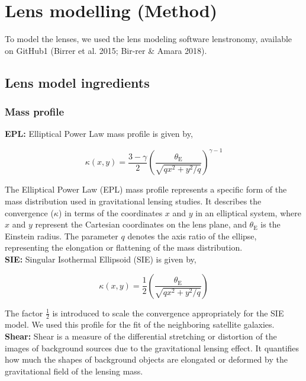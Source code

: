 \documentclass{aa}
\begin{document}
\section{Lens modelling (Method)} \label{sec:modeling_method}

To model the lenses, we used the lens modeling software lenstronomy, available on GitHub1 (Birrer et al. 2015; Bir-rer \& Amara 2018).

\subsection{Lens model ingredients}

\subsubsection{Mass profile}
\textbf{EPL:} Elliptical Power Law mass profile is given by, 

$$
\kappa\left(x, y\right)=\frac{3-\gamma}{2}\left(\frac{\theta_{\mathrm{E}}}{\sqrt{q x^2+y^2 / q}}\right)^{\gamma-1}
$$

The Elliptical Power Law (EPL) mass profile represents a specific form of the mass distribution used in gravitational lensing studies. It describes the convergence (\(\kappa\)) in terms of the coordinates \(x\) and \(y\) in an elliptical system, where \(x\) and \(y\) represent the Cartesian coordinates on the lens plane, and \(\theta_{\mathrm{E}}\) is the Einstein radius. The parameter \(q\) denotes the axis ratio of the ellipse, representing the elongation or flattening of the mass distribution.
\\
\newline
\textbf{SIE:} Singular Isothermal Ellipsoid (SIE) is given by,

$$
\kappa\left(x, y\right)=\frac{1}{2}\left(\frac{\theta_{\mathrm{E}}}{\sqrt{q x^2+y^2 / q}}\right)
$$

The factor $\frac{1}{2}$ is introduced to scale the convergence appropriately for the SIE model. We used this profile for the fit of the neighboring satellite galaxies.
\\
\newline
\textbf{Shear:} Shear is a measure of the differential stretching or distortion of the images of background sources due to the gravitational lensing effect. It quantifies how much the shapes of background objects are elongated or deformed by the gravitational field of the lensing mass.\\
\end{document}

